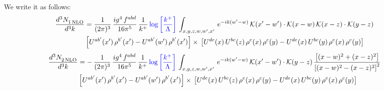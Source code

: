 \documentclass[9pt]{article}
\numberwithin{equation}{section}
\begin{document}
We write it as follows: 
\begin{align}
   \frac{d^{3}N_{1\,\rm NLO}^{\rm}}{d^{3}k}  & = \frac{1}{(2\pi)^{3}}\,\frac{ig^{4}\,f^{abd}}{16\pi^{5}}\,\frac{1}{k^{+}}\,{\color{blue}\log{\left[\frac{k^{+}}{\Lambda}\right]}}\,\int_{x,y,z,w,w',x'}\,e^{-ik(w^\prime-w)}\, \mathcal{K}(x'-w')\cdot \mathcal{K}(x-w)\, \mathcal{K}(x-z)\cdot \mathcal{K}(y-z) \notag \\ & \left[U^{ab'}(x')\,\rho^{b'}(x')-U^{ab'}(w')\, \rho^{b'}(x')\right]\times\, \left[U^{de}(x)\,U^{bc}(z)\, \rho^{e}(x)\,\rho^{c}(y)-U^{de}(x)\,U^{bc}(y)\,\rho^{e}(x)\,\rho^{c}(y)\right]
\end{align}
\begin{align}
   \frac{d^{3}N_{2\,\rm NLO}^{\rm}}{d^{3}k}  & = -\,\frac{1}{(2\pi)^{3}}\, \frac{ig^{4}\, f^{abd}}{16\pi^{5}}\, \frac{1}{k^{+}}\,{\color{blue}\log{\left[\frac{k^{+}}{\Lambda}\right]}}\,\int_{x,y,z,w,w',x'}\,e^{-ik(w^\prime-w)}\, \mathcal{K}(x'-w')\cdot \mathcal{K}(y-z)\, \frac{\left[(x-w)^{2}+(x-z)^{2}\right]}{\left[(x-w)^{2}-(x-z)^{2}\right]^{2}} \notag \\ & \left[U^{ab'}(x')\,\rho^{b'}(x')-U^{ab'}(w')\, \rho^{b'}(x')\right]\times\,\left[U^{de}(x)\,U^{bc}(z)\, \rho^{e}(x)\,\rho^{c}(y)-U^{de}(x)\,U^{bc}(y)\,\rho^{e}(x)\,\rho^{c}(y)\right] 
\end{align}
\end{document}
